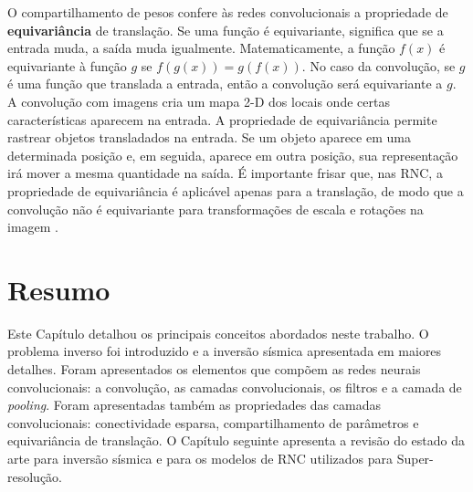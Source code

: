 O compartilhamento de pesos confere às redes convolucionais a propriedade de \textbf{equivariância} de
translação. Se uma função é equivariante, significa que se a entrada muda,
a saída muda igualmente. Matematicamente, a função $f(x)$ é equivariante à função $g$ se
$f(g(x)) = g(f(x))$. No caso da convolução, se $g$ é uma função que translada a entrada, então
a convolução será equivariante a $g$.
A convolução com imagens cria um mapa 2-D dos locais onde certas características aparecem na entrada.
A propriedade de equivariância permite rastrear objetos transladados na entrada. Se um objeto aparece
em uma determinada posição e, em seguida, aparece em outra posição, sua representação
irá mover a mesma quantidade na saída. É importante frisar que, nas RNC, a propriedade de equivariância
é aplicável apenas para a translação, de modo que a convolução não é equivariante para transformações 
de escala e rotações na imagem \citep{Gdfl16}.

\section{Resumo}

Este Capítulo detalhou os principais conceitos abordados neste trabalho. O
problema inverso foi introduzido e a inversão sísmica apresentada em
maiores detalhes. Foram apresentados os elementos que compõem as redes
neurais convolucionais: a convolução, as camadas convolucionais, os filtros e a camada de \textit{pooling}.
Foram apresentadas também as propriedades das camadas convolucionais: conectividade esparsa,
compartilhamento de parâmetros e equivariância de translação. O Capítulo seguinte apresenta a
revisão do estado da arte para inversão sísmica e para os modelos de RNC utilizados para Super-resolução.